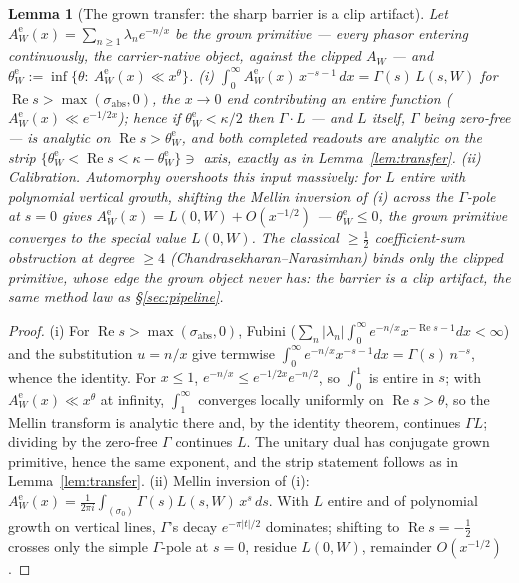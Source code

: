 \documentclass[11pt]{article}
\newtheorem{lemma}[theorem]{Lemma}
\theoremstyle{definition}
\renewcommand{\Re}{\operatorname{Re}}
\begin{document}
\begin{lemma}[The grown transfer: the sharp barrier is a clip artifact]\label{lem:growntransfer}
Let $A^{\mathrm e}_W(x)=\sum_{n\ge1}\lambda_n e^{-n/x}$ be the \emph{grown} primitive --- every phasor
entering continuously, the carrier-native object, against the clipped $A_W$ --- and
$\theta^{\mathrm e}_W:=\inf\{\theta:\ A^{\mathrm e}_W(x)\ll x^{\theta}\}$.
\textup{(i)} $\int_0^\infty A^{\mathrm e}_W(x)\,x^{-s-1}\,dx=\Gamma(s)\,L(s,W)$ for
$\Re s>\max(\sigma_{\mathrm{abs}},0)$, the $x\to0$ end contributing an entire function
($A^{\mathrm e}_W(x)\ll e^{-1/2x}$); hence if $\theta^{\mathrm e}_W<\kappa/2$ then $\Gamma\cdot L$ ---
and $L$ itself, $\Gamma$ being zero-free --- is analytic on $\Re s>\theta^{\mathrm e}_W$, and both completed
readouts are analytic on the strip $\{\theta^{\mathrm e}_W<\Re s<\kappa-\theta^{\mathrm e}_W\}\ni$ axis,
exactly as in Lemma~\ref{lem:transfer}.
\textup{(ii)} \emph{Calibration.} Automorphy overshoots this input massively: for $L$ entire with
polynomial vertical growth, shifting the Mellin inversion of \textup{(i)} across the $\Gamma$-pole at $s=0$
gives $A^{\mathrm e}_W(x)=L(0,W)+O(x^{-1/2})$ --- $\theta^{\mathrm e}_W\le0$, the grown primitive
\emph{converges to the special value} $L(0,W)$. The classical $\ge\tfrac12$ coefficient-sum obstruction at
degree $\ge4$ (Chandrasekharan--Narasimhan) binds only the \emph{clipped} primitive, whose edge the grown
object never has: the barrier is a clip artifact, the same method law as \S\ref{sec:pipeline}.
\end{lemma}
\begin{proof}
\textup{(i)} For $\Re s>\max(\sigma_{\mathrm{abs}},0)$, Fubini
($\sum_n|\lambda_n|\int_0^\infty e^{-n/x}x^{-\Re s-1}dx<\infty$) and the substitution $u=n/x$ give termwise
$\int_0^\infty e^{-n/x}x^{-s-1}dx=\Gamma(s)\,n^{-s}$, whence the identity. For $x\le1$,
$e^{-n/x}\le e^{-1/2x}e^{-n/2}$, so $\int_0^1$ is entire in $s$; with $A^{\mathrm e}_W(x)\ll x^{\theta}$ at
infinity, $\int_1^\infty$ converges locally uniformly on $\Re s>\theta$, so the Mellin transform is analytic
there and, by the identity theorem, continues $\Gamma L$; dividing by the zero-free $\Gamma$ continues $L$.
The unitary dual has conjugate grown primitive, hence the same exponent, and the strip statement follows as
in Lemma~\ref{lem:transfer}.
\textup{(ii)} Mellin inversion of \textup{(i)}: $A^{\mathrm e}_W(x)=\frac1{2\pi i}\int_{(\sigma_0)}
\Gamma(s)L(s,W)\,x^{s}\,ds$. With $L$ entire and of polynomial growth on vertical lines, $\Gamma$'s decay
$e^{-\pi|t|/2}$ dominates; shifting to $\Re s=-\tfrac12$ crosses only the simple $\Gamma$-pole at $s=0$,
residue $L(0,W)$, remainder $O(x^{-1/2})$.
\end{proof}
\end{document}
